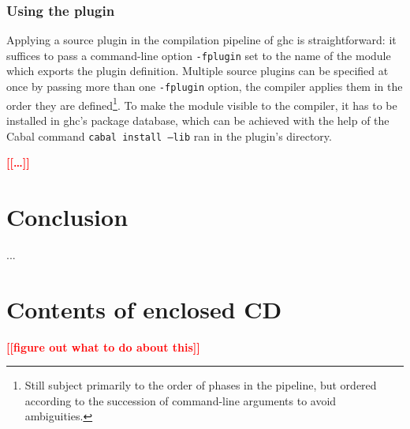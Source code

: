 \documentclass[thesis=B,english]{FITthesis}[2019/12/23]
\newcommand{\todo}[1]{\textcolor{red}{\textbf{[[#1]]}}}
\begin{document}
\subsection*{Using the plugin}
Applying a source plugin in the compilation pipeline of \acrshort{ghc} is
straightforward: it suffices to pass a command-line option \texttt{-fplugin}
set to the name of the module which exports the plugin definition. Multiple
source plugins can be specified at once by passing more than one
\texttt{-fplugin} option, the compiler applies them in the order they are
defined\footnote{Still subject primarily to the order of phases in the
pipeline, but ordered according to the succession of command-line arguments to
avoid ambiguities.}. To make the module visible to the compiler, it has to be
installed in \acrshort{ghc}'s package database, which can be achieved with the
help of the Cabal command \texttt{cabal install --lib} ran in the
plugin's directory.

\todo{\ldots}



\chapter{Conclusion}
...




\appendix

\printglossary[type=\acronymtype]


\chapter{Contents of enclosed CD}

\todo{figure out what to do about this}

\begin{figure}
\end{figure}
\end{document}
